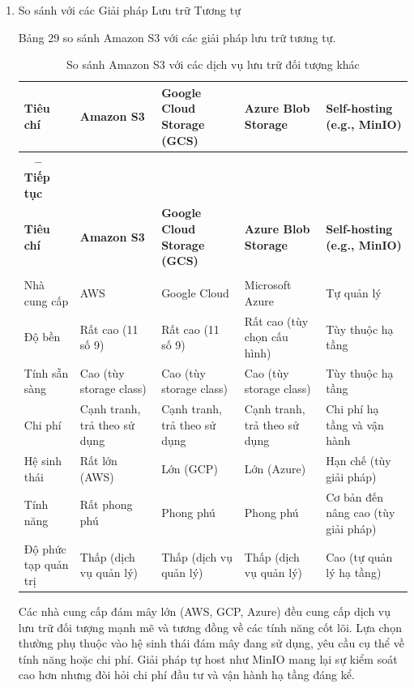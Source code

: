 \begin{enumerate}[label=\arabic*., font=\bfseries]
    \item So sánh với các Giải pháp Lưu trữ Tương tự
    
	Bảng 29 so sánh Amazon S3 với các giải pháp lưu trữ tương tự.

	\begin{longtable}{|>{\raggedright\arraybackslash}p{3cm}|>{\centering\arraybackslash}p{3cm}|>{\centering\arraybackslash}p{3cm}|>{\centering\arraybackslash}p{3cm}|>{\centering\arraybackslash}p{3cm}|}
		\caption{So sánh Amazon S3 với các dịch vụ lưu trữ đối tượng khác}\\
		\hline
		\textbf{Tiêu chí} & \textbf{Amazon S3} & \textbf{Google Cloud Storage (GCS)} & \textbf{Azure Blob Storage} & \textbf{Self-hosting (e.g., MinIO)} \\ %
		\hline \endfirsthead
		\multicolumn{5}{c}
		{{\bfseries \tablename\ \thetable{} -- Tiếp tục}} \\
		\hline
		\textbf{Tiêu chí} & \textbf{Amazon S3} & \textbf{Google Cloud Storage (GCS)} & \textbf{Azure Blob Storage} & \textbf{Self-hosting (e.g., MinIO)} \\ %
		\hline \endhead
		\hline \multicolumn{5}{r}{{Tiếp tục ở trang sau}} \\ \endfoot
		\hline \endlastfoot
		Nhà cung cấp & AWS & Google Cloud & Microsoft Azure & Tự quản lý \\
		\hline
		Độ bền & Rất cao (11 số 9) & Rất cao (11 số 9) & Rất cao (tùy chọn cấu hình) & Tùy thuộc hạ tầng \\
		\hline
		Tính sẵn sàng & Cao (tùy storage class) & Cao (tùy storage class) & Cao (tùy storage class) & Tùy thuộc hạ tầng \\
		\hline
		Chi phí & Cạnh tranh, trả theo sử dụng & Cạnh tranh, trả theo sử dụng & Cạnh tranh, trả theo sử dụng & Chi phí hạ tầng và vận hành \\
		\hline
		Hệ sinh thái & Rất lớn (AWS) & Lớn (GCP) & Lớn (Azure) & Hạn chế (tùy giải pháp) \\
		\hline
		Tính năng & Rất phong phú & Phong phú & Phong phú & Cơ bản đến nâng cao (tùy giải pháp) \\
		\hline
		Độ phức tạp quản trị & Thấp (dịch vụ quản lý) & Thấp (dịch vụ quản lý) & Thấp (dịch vụ quản lý) & Cao (tự quản lý hạ tầng) \\
		\hline
	\end{longtable}
    Các nhà cung cấp đám mây lớn (AWS, GCP, Azure) đều cung cấp dịch vụ lưu trữ đối tượng mạnh mẽ và tương đồng về các tính năng cốt lõi. Lựa chọn thường phụ thuộc vào hệ sinh thái đám mây đang sử dụng, yêu cầu cụ thể về tính năng hoặc chi phí. Giải pháp tự host như MinIO mang lại sự kiểm soát cao hơn nhưng đòi hỏi chi phí đầu tư và vận hành hạ tầng đáng kể.


\end{enumerate}
